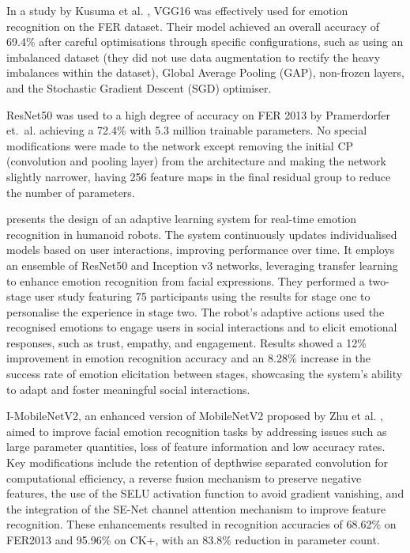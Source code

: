 In a study by Kusuma et al. \cite{Kusuma2020-oa}, VGG16 was effectively used for emotion recognition on the FER dataset. Their model achieved an overall accuracy of 69.4\% after careful optimisations through specific configurations, such as using an imbalanced dataset (they did not use data augmentation to rectify the heavy imbalances within the dataset), Global Average Pooling (GAP), non-frozen layers, and the Stochastic Gradient Descent (SGD) optimiser.

ResNet50 was used to a high degree of accuracy on FER 2013 by Pramerdorfer et.\ al. \cite{Pramerdorfer2016-xx} achieving a 72.4\% with 5.3 million trainable parameters. No special modifications were made to the network except removing the initial CP (convolution and pooling layer) from the architecture and making the network slightly narrower, having 256 feature maps in the final residual group to reduce the number of parameters.

\cite{9900581} presents the design of an adaptive learning system for real-time emotion recognition in humanoid robots. The system continuously updates individualised models based on user interactions, improving performance over time. It employs an ensemble of ResNet50 and Inception v3 networks, leveraging transfer learning to enhance emotion recognition from facial expressions. They performed a two-stage user study featuring 75 participants using the results for stage one to personalise the experience in stage two. The robot’s adaptive actions used the recognised emotions to engage users in social interactions and to elicit emotional responses, such as trust, empathy, and engagement. Results showed a 12\% improvement in emotion recognition accuracy and an 8.28\% increase in the success rate of emotion elicitation between stages, showcasing the system's ability to adapt and foster meaningful social interactions.

I-MobileNetV2, an enhanced version of MobileNetV2 proposed by Zhu et al. \cite{Zhu2024-gy}, aimed to improve facial emotion recognition tasks by addressing issues such as large parameter quantities, loss of feature information and low accuracy rates. Key modifications include the retention of depthwise separated convolution for computational efficiency, a reverse fusion mechanism to preserve negative features, the use of the SELU activation function to avoid gradient vanishing, and the integration of the SE-Net channel attention mechanism to improve feature recognition. These enhancements resulted in recognition accuracies of 68.62\% on FER2013 and 95.96\% on CK+, with an 83.8\% reduction in parameter count.

